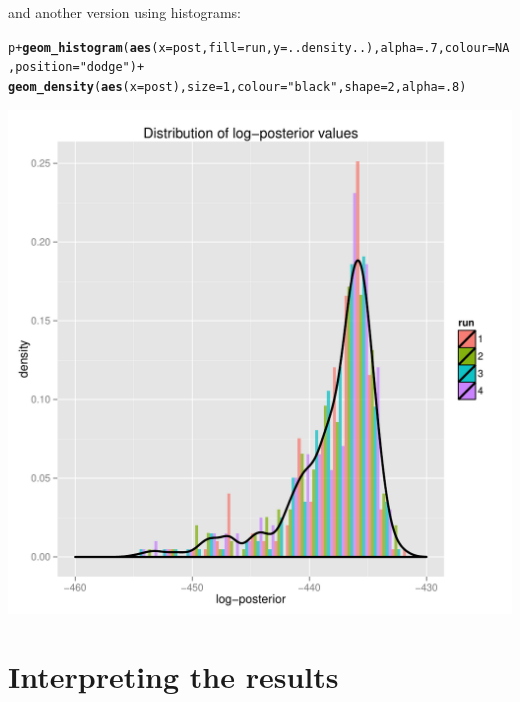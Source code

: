 \documentclass{article}\usepackage[]{graphicx}\usepackage[]{color}
\makeatletter
\newcommand{\hlnum}[1]{\textcolor[rgb]{0.686,0.059,0.569}{#1}}%
\newcommand{\hlstr}[1]{\textcolor[rgb]{0.192,0.494,0.8}{#1}}%
\newcommand{\hlopt}[1]{\textcolor[rgb]{0,0,0}{#1}}%
\newcommand{\hlstd}[1]{\textcolor[rgb]{0.345,0.345,0.345}{#1}}%
\newcommand{\hlkwc}[1]{\textcolor[rgb]{0.333,0.667,0.333}{#1}}%
\newcommand{\hlkwd}[1]{\textcolor[rgb]{0.737,0.353,0.396}{\textbf{#1}}}%
\newenvironment{kframe}{%
 \def\at@end@of@kframe{}%
 \ifinner\ifhmode%
  \def\at@end@of@kframe{\end{minipage}}%
  \begin{minipage}{\columnwidth}%
 \fi\fi%
 \def\FrameCommand##1{\hskip\@totalleftmargin \hskip-\fboxsep
 \colorbox{shadecolor}{##1}\hskip-\fboxsep
     \hskip-\linewidth \hskip-\@totalleftmargin \hskip\columnwidth}%
 \MakeFramed {\advance\hsize-\width
   \@totalleftmargin\z@ \linewidth\hsize
   \@setminipage}}%
 {\par\unskip\endMakeFramed%
 \at@end@of@kframe}
\newenvironment{knitrout}{}{} %
\makeatother
\begin{document}
and another version using histograms:
\begin{knitrout}
\color{fgcolor}\begin{kframe}
\begin{alltt}
\hlstd{p} \hlopt{+} \hlkwd{geom_histogram}\hlstd{(}\hlkwd{aes}\hlstd{(}\hlkwc{x}\hlstd{=post,} \hlkwc{fill}\hlstd{=run,} \hlkwc{y}\hlstd{=..density..),} \hlkwc{alpha}\hlstd{=}\hlnum{.7}\hlstd{,} \hlkwc{colour}\hlstd{=}\hlnum{NA}\hlstd{,} \hlkwc{position}\hlstd{=}\hlstr{"dodge"}\hlstd{)} \hlopt{+}
    \hlkwd{geom_density}\hlstd{(}\hlkwd{aes}\hlstd{(}\hlkwc{x}\hlstd{=post),} \hlkwc{size}\hlstd{=}\hlnum{1}\hlstd{,} \hlkwc{colour}\hlstd{=}\hlstr{"black"}\hlstd{,} \hlkwc{shape}\hlstd{=}\hlnum{2}\hlstd{,} \hlkwc{alpha}\hlstd{=}\hlnum{.8}\hlstd{)}
\end{alltt}


{\ttfamily\noindent\itshape\color{messagecolor}{\#\# stat\_bin: binwidth defaulted to range/30. Use 'binwidth = x' to adjust this.}}\end{kframe}

{\centering \includegraphics[width=.6\textwidth]{figs/unnamed-chunk-18} 

}



\end{knitrout}







\section{Interpreting the results}
\end{document}
